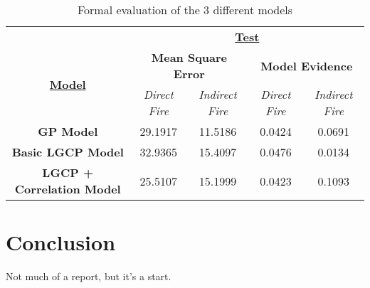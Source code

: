 \documentclass[a4paper,11pt]{report}
\begin{document}
\begin{table}[]
\centering
\caption{Formal evaluation of the 3 different models}
\label{model-comparison}
\begin{tabular}{ccccc}
\multicolumn{1}{l}{}                                       & \multicolumn{4}{c}{{\ul \textbf{Test}}}                                                                                                                                           \\
\multicolumn{1}{c|}{\multirow{2}{*}{{\ul \textbf{Model}}}} & \multicolumn{2}{c|}{\textbf{Mean Square Error}}                                         & \multicolumn{2}{c|}{\textbf{Model Evidence}}                                                         \\
\multicolumn{1}{c|}{}                                      & \multicolumn{1}{c|}{\textit{Direct Fire}} & \multicolumn{1}{c|}{\textit{Indirect Fire}} & \multicolumn{1}{c|}{\textit{Direct Fire}} & \multicolumn{1}{c|}{\textit{Indirect Fire}} \\ \hline
\multicolumn{1}{|c|}{\textbf{GP Model}}                    & \multicolumn{1}{c|}{29.1917}              & \multicolumn{1}{c|}{11.5186}                & \multicolumn{1}{c|}{0.0424}               & \multicolumn{1}{c|}{0.0691}                 \\ \hline
\multicolumn{1}{|c|}{\textbf{Basic LGCP Model}}            & \multicolumn{1}{c|}{32.9365}              & \multicolumn{1}{c|}{15.4097}                & \multicolumn{1}{c|}{0.0476}               & \multicolumn{1}{c|}{0.0134}                 \\ \hline
\multicolumn{1}{|c|}{\textbf{LGCP + Correlation Model}}    & \multicolumn{1}{c|}{25.5107}              & \multicolumn{1}{c|}{15.1999}                & \multicolumn{1}{c|}{0.0423}               & \multicolumn{1}{c|}{0.1093}                 \\ \hline
\end{tabular}
\end{table}




\chapter{Conclusion}
Not much of a report, but it's a start.

\singlespacing 

\newpage



\end{document}
